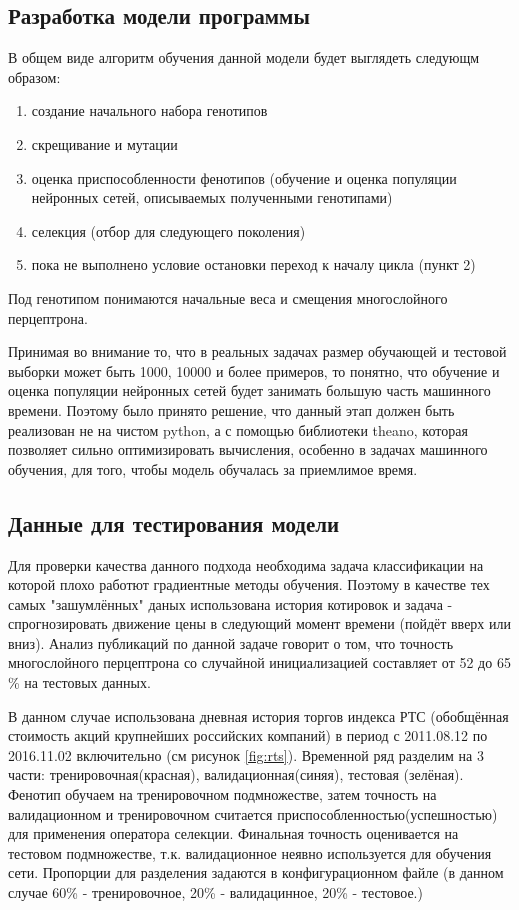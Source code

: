 \documentclass[a4paper,12pt]{article}
\begin{document}
\subsection{Разработка модели программы}
В общем виде алгоритм обучения данной модели будет выглядеть следующм образом:
\begin{enumerate}
\item создание начального набора генотипов
\item скрещивание и мутации
\item оценка приспособленности фенотипов (обучение и оценка популяции нейронных сетей, описываемых полученными генотипами)
\item селекция (отбор для следующего поколения)
\item пока не выполнено условие остановки переход к началу цикла (пункт 2)
\end{enumerate}
Под генотипом понимаются начальные веса и смещения многослойного перцептрона.

\par Принимая во внимание то, что в реальных задачах размер обучающей и тестовой выборки может быть 1000, 10000 и более примеров, то понятно, что обучение и оценка популяции нейронных сетей будет занимать большую часть машинного времени. Поэтому было принято решение, что данный этап должен быть реализован не на чистом python, а с помощью библиотеки theano, которая позволяет сильно оптимизировать вычисления, особенно в задачах машинного обучения, для того, чтобы модель обучалась за приемлимое время.

\subsection{Данные для тестирования модели}

\par Для проверки качества данного подхода необходима задача классификации на которой плохо работют градиентные методы обучения. Поэтому в качестве тех самых "зашумлённых" даных использована история котировок и задача - спрогнозировать движение цены в следующий момент времени (пойдёт вверх или вниз). Анализ публикаций по данной задаче говорит о том, что точность многослойного перцептрона со случайной инициализацией составляет от 52 до 65 \% на тестовых данных.

\par В данном случае использована дневная история торгов индекса РТС (обобщённая стоимость акций крупнейших российских компаний) в период с 2011.08.12 по 2016.11.02 включительно (см рисунок \ref{fig:rts}). Временной ряд разделим на 3 части: тренировочная(красная), валидационная(синяя), тестовая (зелёная). Фенотип обучаем на тренировочном подмножестве, затем точность на валидационном и тренировочном считается приспособленностью(успешностью) для применения оператора селекции. Финальная точность оценивается на тестовом подмножестве, т.к. валидационное неявно используется для обучения сети. Пропорции для разделения задаются в конфигурационном файле (в данном случае 60\% - тренировочное, 20\% - валидацинное, 20\% - тестовое.)
 
\end{document}
